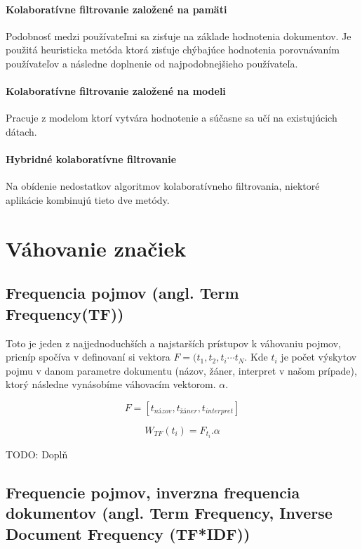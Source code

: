 \paragraph{Kolaboratívne filtrovanie založené na pamäti}

Podobnosť medzi používateľmi sa zisťuje na základe hodnotenia dokumentov. Je použitá heuristicka metóda ktorá zisťuje chýbajúce hodnotenia porovnávaním používateľov a následne doplnenie od najpodobnejšieho používateľa.

\paragraph{Kolaboratívne filtrovanie založené na modeli}

Pracuje z modelom ktorí vytvára hodnotenie a súčasne sa učí na existujúcich dátach.

\paragraph{Hybridné kolaboratívne filtrovanie}

Na obídenie nedostatkov algoritmov kolaboratívneho filtrovania, niektoré aplikácie kombinujú tieto dve metódy.

\section{Váhovanie značiek}

\subsection{Frequencia pojmov (angl. Term Frequency(TF))}

Toto je jeden z najjednoduchších a najstarších prístupov k váhovaniu pojmov,
pricníp spočíva v definovaní si vektora \(F = (t_1, t_2, t_i \cdots t_N\).
Kde \(t_i\) je počet výskytov pojmu v danom parametre dokumentu (názov, žáner,
interpret v našom prípade), ktorý následne vynásobíme váhovacím vektorom. \(\alpha\).

\[F=[t_{názov},t_{žáner},t_{interpret}]\]

\[W_{TF}(t_i) = F_{t_i}.\alpha \]

TODO: Doplň

\subsection{Frequencie pojmov, inverzna frequencia dokumentov (angl. Term Frequency, Inverse Document Frequency (TF*IDF))}

